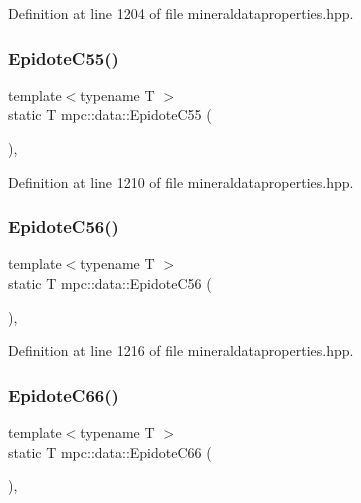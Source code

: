 Definition at line 1204 of file mineraldataproperties.\+hpp.

\mbox{\label{namespacempc_1_1data_acc1948d39dd8dbafd3cad2c4e721ef2c}} 
\subsubsection{\texorpdfstring{Epidote\+C55()}{EpidoteC55()}}
{\footnotesize\ttfamily template$<$typename T $>$ \\
static T mpc\+::data\+::\+Epidote\+C55 (\begin{DoxyParamCaption}{ }\end{DoxyParamCaption})\hspace{0.3cm}{\ttfamily [inline]}, {\ttfamily [static]}}



Definition at line 1210 of file mineraldataproperties.\+hpp.

\mbox{\label{namespacempc_1_1data_a5f2faa4d324fde52f914feb7591044b6}} 
\subsubsection{\texorpdfstring{Epidote\+C56()}{EpidoteC56()}}
{\footnotesize\ttfamily template$<$typename T $>$ \\
static T mpc\+::data\+::\+Epidote\+C56 (\begin{DoxyParamCaption}{ }\end{DoxyParamCaption})\hspace{0.3cm}{\ttfamily [inline]}, {\ttfamily [static]}}



Definition at line 1216 of file mineraldataproperties.\+hpp.

\mbox{\label{namespacempc_1_1data_ae3fb9bbdee9066b574eca0ddcf6d75c8}} 
\subsubsection{\texorpdfstring{Epidote\+C66()}{EpidoteC66()}}
{\footnotesize\ttfamily template$<$typename T $>$ \\
static T mpc\+::data\+::\+Epidote\+C66 (\begin{DoxyParamCaption}{ }\end{DoxyParamCaption})\hspace{0.3cm}{\ttfamily [inline]}, {\ttfamily [static]}}



